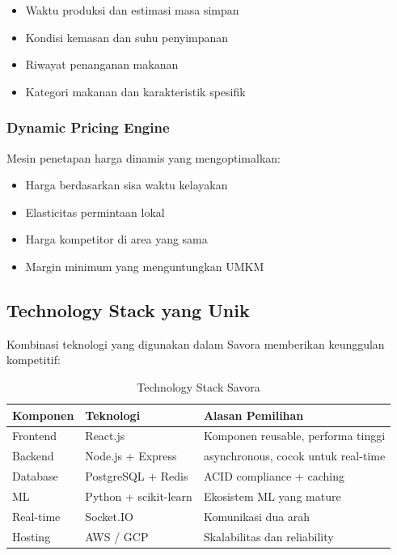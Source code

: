 \begin{itemize}[leftmargin=*]
    \item Waktu produksi dan estimasi masa simpan
    \item Kondisi kemasan dan suhu penyimpanan
    \item Riwayat penanganan makanan
    \item Kategori makanan dan karakteristik spesifik
\end{itemize}

\subsubsection{Dynamic Pricing Engine}
Mesin penetapan harga dinamis yang mengoptimalkan:

\begin{itemize}[leftmargin=*]
    \item Harga berdasarkan sisa waktu kelayakan
    \item Elasticitas permintaan lokal
    \item Harga kompetitor di area yang sama
    \item Margin minimum yang menguntungkan UMKM
\end{itemize}

\subsection{Technology Stack yang Unik}

Kombinasi teknologi yang digunakan dalam Savora memberikan keunggulan kompetitif:

\begin{table}[H]
\centering
\caption{Technology Stack Savora}
\label{tab:tech_stack}
\begin{tabularx}{\textwidth}{|l|Y|Y|}
\hline
\textbf{Komponen} & \textbf{Teknologi} & \textbf{Alasan Pemilihan} \\
\hline
Frontend & React.js & Komponen reusable, performa tinggi \\
\hline
Backend & Node.js + Express & asynchronous, cocok untuk real-time \\
\hline
Database & PostgreSQL + Redis & ACID compliance + caching \\
\hline
ML & Python + scikit-learn & Ekosistem ML yang mature \\
\hline
Real-time & Socket.IO & Komunikasi dua arah \\
\hline
Hosting & AWS / GCP & Skalabilitas dan reliability \\
\hline
\end{tabularx}
\end{table}

